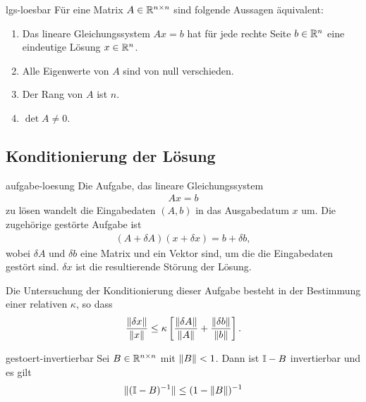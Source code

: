 
\begin{Satz}{lgs-loesbar}
  Für eine Matrix $A\in\mathbb R^{n\times n}$ sind folgende Aussagen äquivalent:
  \begin{enumerate}
  \item Das lineare Gleichungssystem $Ax=b$ hat für jede rechte Seite
    $b\in \mathbb R^n$ eine eindeutige Lösung $x\in \mathbb R^n$.
  \item Alle Eigenwerte von $A$ sind von null verschieden.
  \item Der Rang von $A$ ist $n$.
  \item $\det A \neq 0$.
  \end{enumerate}
\end{Satz}

\subsection{Konditionierung der Lösung}

\begin{Definition}{aufgabe-loesung}
  Die Aufgabe, das lineare Gleichungssystem
  \begin{gather}
    Ax=b
  \end{gather}
  zu lösen wandelt die Eingabedaten $(A,b)$ in das Ausgabedatum $x$
  um. Die zugehörige gestörte Aufgabe ist
  \begin{gather}
    (A+\delta A) (x+\delta x) = b+ \delta b,
  \end{gather}
  wobei $\delta A$ und $\delta b$ eine Matrix und ein Vektor sind, um
  die die Eingabedaten gestört sind. $\delta x$ ist die resultierende
  Störung der Lösung.
  
  Die Untersuchung der Konditionierung dieser Aufgabe besteht in
  der Bestimmung einer relativen  $\kappa$, so dass
  \begin{gather}
    \frac{\lVert\delta x\rVert}{\lVert x\rVert}
    \le \kappa \left[\frac{\lVert\delta A\rVert}{\lVert A\rVert}
      +\frac{\lVert\delta b\rVert}{\lVert b\rVert}\right].
  \end{gather}
\end{Definition}

\begin{Lemma}{gestoert-invertierbar}
  Sei $B\in \mathbb R^{n\times n}$ mit $\lVert B\rVert < 1$. Dann ist $\mathbb I -B$
  invertierbar und es gilt
  \begin{gather}
    \lVert(\mathbb I -B)^{-1}\rVert \le (1-\lVert B\rVert)^{-1}
  \end{gather}
\end{Lemma}

